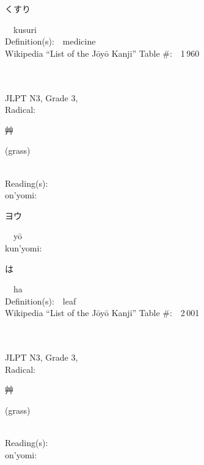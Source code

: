 \begin{multicols}{2}
{\hspace*{2em}}{\begin{CJK}{UTF8}{min} くすり \end{CJK}}\ \ kusuri\ \ \\
Definition(s):\ \ medicine \\
Wikipedia ``List of the J\=oy\=o Kanji'' Table \#:\ \ 1\,960 \\
\ \ \\
{\fontsize{34pt}{40pt}  }\ \ \\  %
{JLPT N3, Grade 3, \\Radical:\ \ {\begin{CJK}{UTF8}{min} 艸 \end{CJK}} (grass) } \\
Reading(s):\ \ \\
{\hspace*{1em}}on'yomi:\ \ \\
{\hspace*{2em}}{\begin{CJK}{UTF8}{min} ヨウ \end{CJK}}\ \ y\=o\ \ \\
{\hspace*{1em}}kun'yomi:\ \ \\
{\hspace*{2em}}{\begin{CJK}{UTF8}{min} は \end{CJK}}\ \ ha\ \ \\
Definition(s):\ \ leaf \\
Wikipedia ``List of the J\=oy\=o Kanji'' Table \#:\ \ 2\,001 \\
\ \ \\
{\fontsize{34pt}{40pt}  }\ \ \\  %
{JLPT N3, Grade 3, \\Radical:\ \ {\begin{CJK}{UTF8}{min} 艸 \end{CJK}} (grass) } \\
Reading(s):\ \ \\
{\hspace*{1em}}on'yomi:\ \ \\

\end{multicols}
